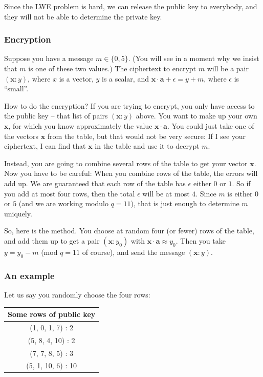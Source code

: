 Since the LWE problem is hard, we can release the public key to
everybody, and they will not be able to determine the private key.

\subsubsection{Encryption}\label{how-to-encrypt-mu}

Suppose you have a message \(m \in \{ 0,5 \}\). (You will see
in a moment why we insist that \(m\) is one of these two values.) The
ciphertext to encrypt \(m\) will be a pair
\(( \mathbf{x}:y )\), where \(x\) is a vector, \(y\) is a
scalar, and \(\mathbf{x} \cdot \mathbf{a} + \epsilon = y + m\), where
\(\epsilon\) is ``small''.

How to do the encryption? If you are trying to encrypt, you only have
access to the public key -- that list of pairs
\(( \mathbf{x}:y )\) above. You want to make up your own
\(\mathbf{x}\), for which you know approximately the value
\(\mathbf{x} \cdot \mathbf{a}\). You could just take one of the vectors
\(\mathbf{x}\) from the table, but that would not be very secure: If I
see your ciphertext, I can find that \(\mathbf{x}\) in the table and use
it to decrypt \(m\).

Instead, you are going to combine several rows of the table to get your
vector \(\mathbf{x}\). Now you have to be careful: When you combine rows
of the table, the errors will add up. We are guaranteed that each row of
the table has \(\epsilon\) either \(0\) or \(1\). So if you add at most
four rows, then the total \(\epsilon\) will be at most \(4\). Since
\(m\) is either \(0\) or \(5\) (and we are working modulo \(q = 11\)),
that is just enough to determine \(m\) uniquely.

So, here is the method. You choose at random four (or fewer) rows of the
table, and add them up to get a pair \(( \mathbf{x}:y_{0} )\)
with \(\mathbf{x} \cdot \mathbf{a} \approx y_{0}\). Then you take
\(y = y_{0} - m\) (mod \(q = 11\) of course), and send the message
\(( \mathbf{x}:y )\).

\subsubsection{An example}\label{an-example}

Let us say you randomly choose the four rows:

\begin{center}
\begin{tabular}{|c|}
\hline
Some rows of public key \\
\hline
\hline
(1, 0, 1, 7) : 2 \\
\hline
(5, 8, 4, 10) : 2 \\
\hline
(7, 7, 8, 5) : 3 \\
\hline
(5, 1, 10, 6) : 10 \\
\hline
\end{tabular}
\end{center}

